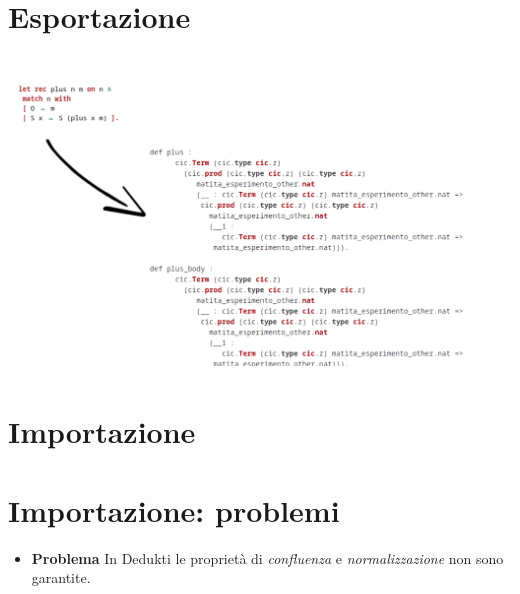 \documentclass{beamer}
\begin{document}
\section{Esportazione}
\begin{frame}
  \includegraphics[scale=0.30]{export.png}
\end{frame}

\section{Importazione}
\begin{frame}

\end{frame}

\section{Importazione: problemi}
\begin{frame}
\begin{itemize}
  \item \alert{\textbf{Problema}} In Dedukti le proprietà di \textit{confluenza} e 
    \textit{normalizzazione} non sono garantite.
\end{itemize}
\end{frame}
\end{document}

